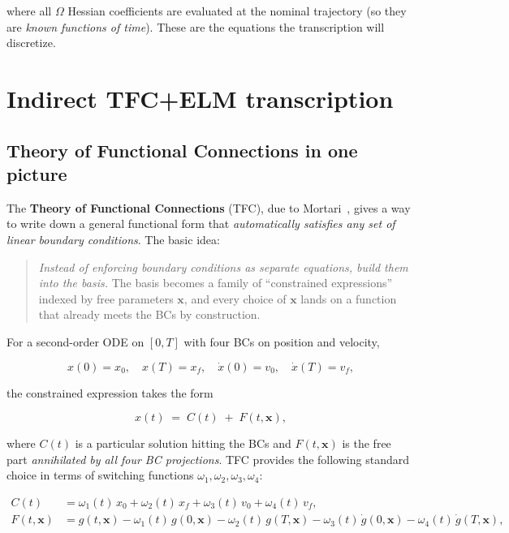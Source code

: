 \documentclass[8pt,a4paper]{article}
\newcommand{\bvec}[1]{\bm{#1}}
\newcommand{\xvec}{\bvec{x}}
\theoremstyle{definition}
\theoremstyle{remark}
\begin{document}
where all $\Omega$ Hessian coefficients are evaluated at the nominal
trajectory (so they are \emph{known functions of time}). These are
the equations the transcription will discretize.


\section{Indirect TFC+ELM transcription}
\label{sec:transcription}

\subsection{Theory of Functional Connections in one picture}

The \textbf{Theory of Functional Connections} (TFC), due to
Mortari~\cite{Mortari2017}, gives a way to write down a general
functional form that \emph{automatically satisfies any set of linear
boundary conditions}. The basic idea:

\begin{quote}
\emph{Instead of enforcing boundary conditions as separate equations,
build them into the basis.} The basis becomes a family of
``constrained expressions'' indexed by free parameters $\xvec$,
and every choice of $\xvec$ lands on a function that already meets
the BCs by construction.
\end{quote}

For a second-order ODE on $[0, T]$ with four BCs on position and
velocity,

\begin{equation}
  x(0) = x_0,\quad x(T) = x_f,\quad \dot x(0) = v_0,\quad \dot x(T) = v_f,
\end{equation}

the constrained expression takes the form

\begin{equation}
  x(t) \;=\; C(t) \;+\; F(t, \xvec),
\end{equation}

where $C(t)$ is a particular solution hitting the BCs and $F(t,
\xvec)$ is the free part \emph{annihilated by all four BC
projections}. TFC provides the following standard choice in terms
of switching functions $\omega_1, \omega_2, \omega_3, \omega_4$:

\begin{align}
  C(t) &= \omega_1(t)\, x_0 + \omega_2(t)\, x_f
        + \omega_3(t)\, v_0 + \omega_4(t)\, v_f, \\
  F(t, \xvec) &= g(t, \xvec)
        - \omega_1(t)\, g(0, \xvec) - \omega_2(t)\, g(T, \xvec)
        - \omega_3(t)\, \dot g(0, \xvec) - \omega_4(t)\, \dot g(T, \xvec),
\end{align}
\end{document}
